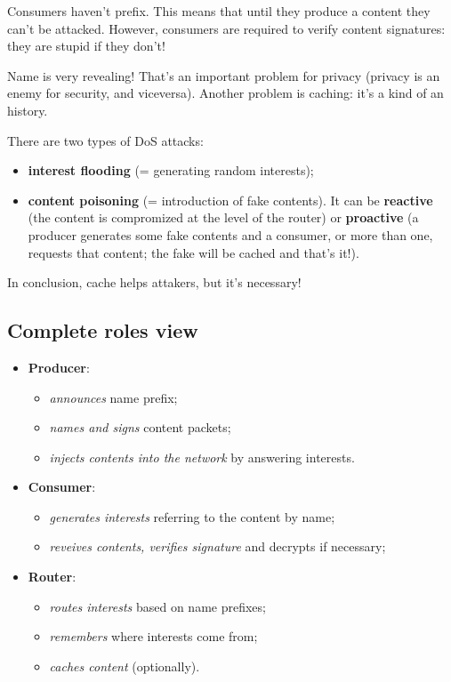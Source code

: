 Consumers haven't prefix. This means that until they produce a content they
can't be attacked. However, consumers are required to verify content
signatures: they are stupid if they don't!

Name is very revealing! That's an important problem for privacy (privacy is an
enemy for security, and viceversa). Another problem is caching: it's a kind of
an history.

There are two types of DoS attacks:
\begin{itemize}
  \item \textbf{interest flooding} (= generating random interests);
  \item \textbf{content poisoning} (= introduction of fake contents). It can be
\textbf{reactive} (the content is compromized at the level of the router) or
\textbf{proactive} (a producer generates some fake contents and a consumer, or
more than one, requests that content; the fake will be cached and that's it!).
\end{itemize}
In conclusion, cache helps attakers, but it's necessary!

\subsection{Complete roles view}
\begin{itemize}
  \item \textbf{Producer}:
  \begin{itemize}
    \item \textit{announces} name prefix;
    \item \textit{names and signs} content packets;
    \item \textit{injects contents into the network} by answering interests.
  \end{itemize}
  \item \textbf{Consumer}:
  \begin{itemize}
    \item \textit{generates interests} referring to the content by name;
    \item \textit{reveives contents, verifies signature} and decrypts if
necessary;
  \end{itemize}
  \item \textbf{Router}:
  \begin{itemize}
    \item \textit{routes interests} based on name prefixes;
    \item \textit{remembers} where interests come from;
    \item \textit{caches content} (optionally).
  \end{itemize}
\end{itemize}
